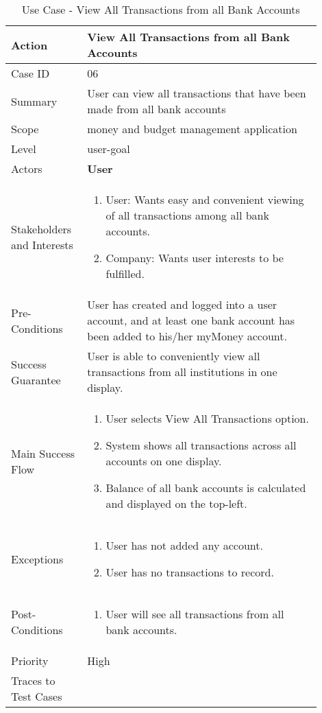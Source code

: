 \documentclass[11pt]{article}
\newcounter{use case ID}
\newcommand\tabularhead[1]{
    \begin{table}[ht]
        \addtocounter{use case ID}{1}
        \caption{Use Case \arabic{use case ID} - #1}
        \vspace{0.2cm}
        \begin{tabular}{|p{0.2\linewidth}|p{0.70\linewidth}|}
            \hline
            \textbf{Action} & \textbf{#1} \\
            \hline}
\newcommand\addrow[2]{#1 & #2\\ \hline}
\newcommand\addmulrow[2]{ \begin{minipage}[t][][t]{2.5cm}#1\end{minipage}
                &\begin{minipage}[t][][t]{11cm}
                    \begin{enumerate}[itemsep=-1ex] #2   \end{enumerate}
                \end{minipage}\vfill\\ \hline}
\newenvironment{usecase}{\tabularhead}
        {\hline\end{tabular}\end{table}}
\begin{document}
\begin{usecase}{View All Transactions from all Bank Accounts}
    \addrow{Case ID}{06}
    \addrow{Summary}{User can view all transactions that have been made from all bank accounts}
    \addrow{Scope}{money and budget management application}
    \addrow{Level}{user-goal}
    \addrow{Actors}{\textbf{User}}
    \addmulrow{Stakeholders and Interests}{
    \item User: Wants easy and convenient viewing of all transactions among all bank accounts.
    \item Company: Wants user interests to be fulfilled.}
    \addrow{Pre-Conditions}{User has created and logged into a user account, and at least one bank account has been added to his/her myMoney account.}
    \addrow{Success Guarantee}{User is able to conveniently view all transactions from all institutions in one display.}
    \addmulrow{Main Success Flow}{
    \item User selects View All Transactions option.
    \item System shows all transactions across all accounts on one display.
	\item Balance of all bank accounts is calculated and displayed on the top-left.}
    \addmulrow{Exceptions}{
    \item User has not added any account.
    \item User has no transactions to record.}
    \addmulrow{Post-Conditions}{
    \item User will see all transactions from all bank accounts.
    }
    \addrow{Priority}{High}
    \addrow{Traces to Test Cases}{}
\end{usecase}
\end{document}
